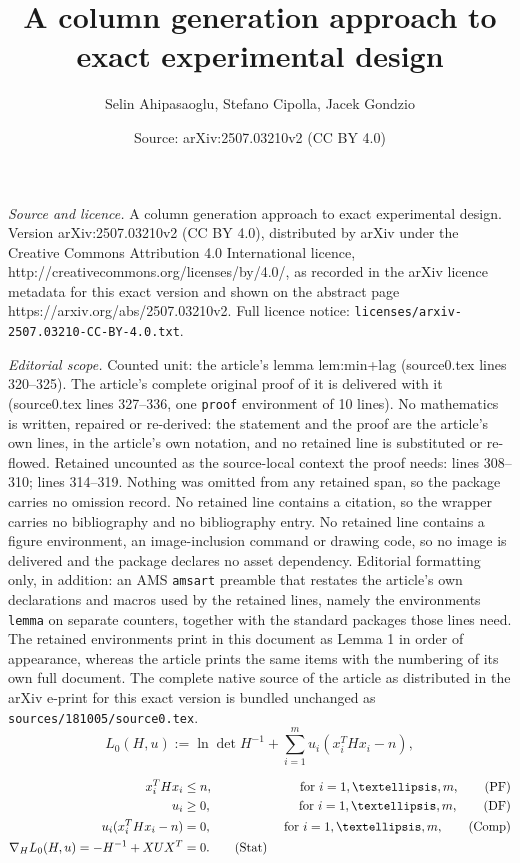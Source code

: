 \documentclass[10pt,a4paper]{amsart}
\title{A column generation approach to exact experimental design}
\author{Selin Ahipasaoglu, Stefano Cipolla, Jacek Gondzio}
\date{Source: arXiv:2507.03210v2 (CC BY 4.0)}
\begin{document}
\maketitle

\noindent\emph{Source and licence.} A column generation approach to exact experimental design. Version arXiv:2507.03210v2 (CC BY 4.0), distributed by arXiv under the Creative Commons Attribution 4.0 International licence, http://creativecommons.org/licenses/by/4.0/, as recorded in the arXiv licence metadata for this exact version and shown on the abstract page https://arxiv.org/abs/2507.03210v2. Full licence notice: \texttt{licenses/arxiv-2507.03210-CC-BY-4.0.txt}.\par\smallskip

\noindent\textit{Editorial scope.} Counted unit: the article's lemma lem:min+lag (source0.tex lines 320--325). The article's complete original proof of it is delivered with it (source0.tex lines 327--336, one \texttt{proof} environment of 10 lines). No mathematics is written, repaired or re-derived: the statement and the proof are the article's own lines, in the article's own notation, and no retained line is substituted or re-flowed.  Retained uncounted as the source-local context the proof needs: lines 308--310; lines 314--319.  Nothing was omitted from any retained span, so the package carries no omission record.  No retained line contains a citation, so the wrapper carries no bibliography and no bibliography entry.  No retained line contains a figure environment, an image-inclusion command or drawing code, so no image is delivered and the package declares no asset dependency.  Editorial formatting only, in addition: an AMS \texttt{amsart} preamble that restates the article's own declarations and macros used by the retained lines, namely the environments \texttt{lemma} on separate counters, together with the standard packages those lines need.  The retained environments print in this document as Lemma 1 in order of appearance, whereas the article prints the same items with the numbering of its own full document.  The complete native source of the article as distributed in the arXiv e-print for this exact version is bundled unchanged as \texttt{sources/181005/source0.tex}.
\begin{equation}\label{eq:Lag}
	L_0(H, u):=   \ln \det H^{-1} +\sum_{i=1}^m u_i(x_i^THx_i-n),
\end{equation}

	\begin{align}
		x_i^THx_i & \leq n,  & \hbox{ for } i =1, \dots, m,   \label{KKT_1}   \tag{PF} \\
		u_i  & \geq 0, & \hbox{ for } i =1, \dots, m,   \label{KKT_2} \tag{DF} \\
		u_i (x_i^THx_i -n) & = 0, & \hbox{ for } i =1, \dots, m,   \label{KKT_3} \tag{Comp}  \\
		\nabla_HL_0(H,u)= -H^{-1}+XUX^T&= 0.  \label{KKT_4} \tag{Stat}
	\end{align}
\end{document}
